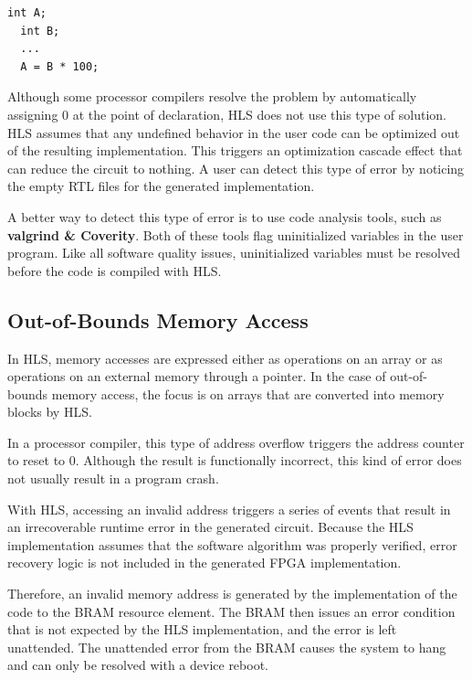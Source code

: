 \begin{lstlisting}[style=CStyle]
  int A;
  int B;
  ...
  A = B * 100;
\end{lstlisting}

Although some processor compilers resolve the problem by automatically assigning 0 at the point of declaration, HLS does not use this type of solution. HLS assumes that any undefined behavior in the user code can be optimized out of the resulting implementation. This triggers an optimization cascade effect that can reduce the
circuit to nothing. A user can detect this type of error by noticing the empty RTL files for the generated implementation.

\par A better way to detect this type of error is to use code analysis tools, such as \textbf{valgrind \& Coverity}. Both of these tools flag uninitialized variables in the user program. Like all
software quality issues, uninitialized variables must be resolved before the code is compiled with HLS.

\subsection{Out-of-Bounds Memory Access}
In HLS, memory accesses are expressed either as operations on an array or as operations on an external memory through a pointer. In the case of out-of-bounds memory access, the focus is on arrays that are converted into memory blocks by HLS.

\par In a processor compiler, this type of address overflow triggers the address counter to reset to 0.  Although the result is functionally incorrect, this kind of error does not usually result in a program crash.

\par With HLS, accessing an invalid address triggers a series of events that result in an irrecoverable runtime error in the generated circuit. Because the HLS implementation assumes that the software algorithm was properly verified, error recovery logic is not included in the generated FPGA implementation. 

Therefore, an invalid memory address is generated by the implementation of the code to the BRAM resource element. The BRAM then issues an error condition that is not expected by the HLS implementation, and the error is left unattended. The unattended error from the BRAM causes the system to hang and can only be resolved with a device reboot.

